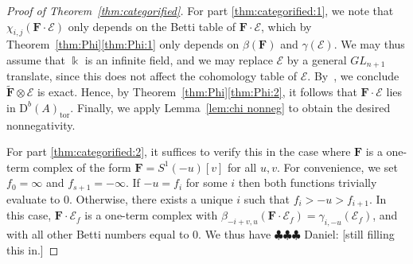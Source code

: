 \documentclass[12pt]{amsart}
\theoremstyle{definition}
\theoremstyle{remark}
\newcommand{\kk}{\Bbbk}
\newcommand{\cE}{\mathcal{E}}
\newcommand{\FF}{\mathbf{F}}
\newcommand{\GL}{{GL}}
\newcommand{\DD}{\mathrm{D}}
\newcommand{\daniel}[1]{{\color{green} \sf $\clubsuit\clubsuit\clubsuit$ Daniel: [#1]}}
\begin{document}
\begin{proof}[Proof of Theorem~\ref{thm:categorified}]
For part \eqref{thm:categorified:1}, we note that $\chi_{i,j}(\FF\cdot \cE)$ only depends on the Betti table of $\FF\cdot \cE$, which by Theorem~\ref{thm:Phi}\eqref{thm:Phi:1} only depends on $\beta(\FF)$ and $\gamma(\cE)$.  We may thus assume that $\kk$ is an infinite field, and we may replace $\cE$ by a general $\GL_{n+1}$ translate, since this does not affect the cohomology table of $\cE$.  By~\cite[Theorem]{miller-speyer}, we  conclude $\widetilde{\FF}\otimes \cE$ is exact.  Hence, by Theorem~\ref{thm:Phi}\eqref{thm:Phi:2}, it follows that $\FF\cdot \cE$ lies in $\DD^b(A)_{\text{tor}}$.  Finally, we apply Lemma~\ref{lem:chi nonneg} to obtain the desired nonnegativity.


For part \eqref{thm:categorified:2}, it suffices to verify this in the case where $\FF$ is a one-term complex of the form $\FF=S^1(-u)[v]$ for all $u,v$.  For convenience, we set $f_0=\infty$ and $f_{s+1}=-\infty$. If $-u=f_i$ for some $i$ then both functions trivially evaluate to $0$.  Otherwise, there exists a unique $i$ such that $f_i>-u>f_{i+1}$.  In this case, $\FF\cdot \cE_f$ is a one-term complex with $\beta_{-i+v,u}(\FF\cdot \cE_f)=\gamma_{i,-u}(\cE_f)$, and with all other Betti numbers equal to $0$.  We thus have \daniel{still filling this in.}
\end{proof}
\end{document}
